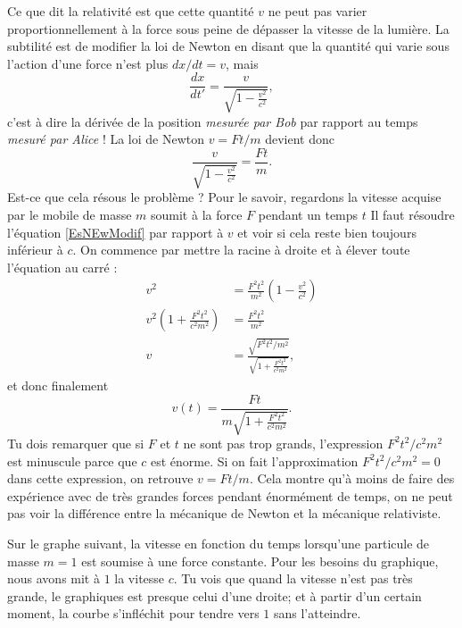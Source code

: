 Ce que dit la relativité est que cette quantité $v$ ne peut pas varier proportionnellement à la force sous peine de dépasser la vitesse de la lumière. La subtilité est de modifier la loi de Newton en disant que la quantité qui varie sous l'action d'une force n'est plus $dx/dt=v$, mais
\[ 
	\frac{ dx }{ dt' }=   \frac{ v }{ \sqrt{1-\frac{ v^2 }{ c^2 }} },
\]
c'est à dire la dérivée de la position \emph{mesurée par Bob} par rapport au temps \emph{mesuré par Alice} !  La loi de Newton $v=Ft/m$ devient donc
\begin{equation}	\label{EsNEwModif}
\frac{ v }{ \sqrt{1-\frac{ v^2 }{ c^2 }} }=\frac{ Ft }{ m }.
\end{equation}
Est-ce que cela résous le problème ? Pour le savoir, regardons la vitesse acquise par le mobile de masse $m$ soumit à la force $F$ pendant un temps $t$ Il faut résoudre l'équation \eqref{EsNEwModif} par rapport à $v$ et voir si cela reste bien toujours inférieur à $c$. On commence par mettre la racine à droite et à élever toute l'équation au carré :
\[ 
\begin{split}
v^2&=\frac{ F^2t^2 }{ m^2 }\left( 1-\frac{ v^2 }{ c^2 } \right)\\
v^2\left( 1+\frac{ F^2t^2 }{ c^2m^2 } \right)&=\frac{ F^2t^2 }{ m^2 }\\
v&=\frac{ \sqrt{F^2t^2/m^2} }{ \sqrt{1+\frac{ F^2t^2 }{ c^2m^2 }} },
\end{split}
\]
et donc finalement
\begin{equation}	\label{EqVfntRel}
v(t)=\frac{ Ft }{ m\sqrt{1+\frac{ F^2t^2 }{ c^2m^2 }} }.
\end{equation}
Tu dois remarquer que si $F$ et $t$ ne sont pas trop grands, l'expression $F^2t^2/c^2m^2$ est minuscule parce que $c$ est énorme. Si on fait l'approximation $F^2t^2/c^2m^2=0$ dans cette expression, on retrouve $v=Ft/m$. Cela montre qu'à moins de faire des expérience avec de très grandes forces pendant énormément de temps, on ne peut pas voir la différence entre la mécanique de Newton et la mécanique relativiste.

\begin{center}
   
\end{center}

Sur le graphe suivant, la vitesse en fonction du temps lorsqu'une particule de masse \( m=1\) est soumise à une force constante. Pour les besoins du graphique, nous avons mit à $1$ la vitesse $c$. Tu vois que quand la vitesse n'est pas très grande, le graphiques est presque celui d'une droite; et à partir d'un certain moment, la courbe s'infléchit pour tendre vers $1$ sans l'atteindre.

